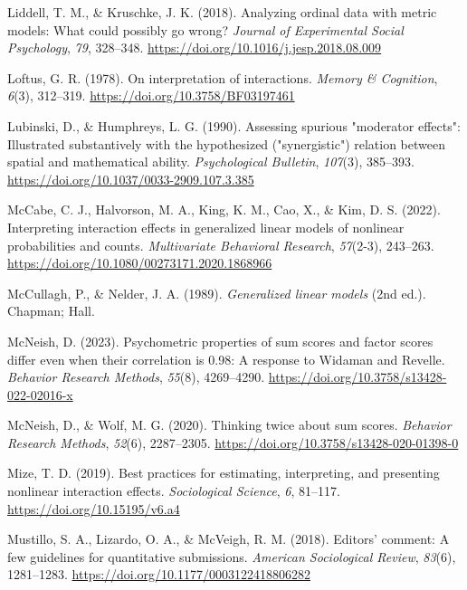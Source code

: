 \documentclass[
  man,
  floatsintext,
  longtable,
  nolmodern,
  notxfonts,
  notimes,
  colorlinks=true,linkcolor=blue,citecolor=blue,urlcolor=blue]{apa7}
\newlength{\cslhangindent}
\newenvironment{CSLReferences}[2] %
 {\begin{list}{}{%
  \setlength{\itemindent}{0pt}
  \setlength{\leftmargin}{0pt}
  \setlength{\parsep}{0pt}
  \ifodd #1
   \setlength{\leftmargin}{\cslhangindent}
   \setlength{\itemindent}{-1\cslhangindent}
  \fi
  \setlength{\itemsep}{#2\baselineskip}}}
 {\end{list}}
\begin{document}
\begin{CSLReferences}{1}{0}
Liddell, T. M., \& Kruschke, J. K. (2018). Analyzing ordinal data with
metric models: What could possibly go wrong? \emph{Journal of
Experimental Social Psychology}, \emph{79}, 328--348.
\url{https://doi.org/10.1016/j.jesp.2018.08.009}

Loftus, G. R. (1978). On interpretation of interactions. \emph{Memory \&
Cognition}, \emph{6}(3), 312--319.
\url{https://doi.org/10.3758/BF03197461}

Lubinski, D., \& Humphreys, L. G. (1990). Assessing spurious
{"}moderator effects{"}: Illustrated substantively with the hypothesized
({"}synergistic{"}) relation between spatial and mathematical ability.
\emph{Psychological Bulletin}, \emph{107}(3), 385--393.
\url{https://doi.org/10.1037/0033-2909.107.3.385}

McCabe, C. J., Halvorson, M. A., King, K. M., Cao, X., \& Kim, D. S.
(2022). Interpreting interaction effects in generalized linear models of
nonlinear probabilities and counts. \emph{Multivariate Behavioral
Research}, \emph{57}(2-3), 243--263.
\url{https://doi.org/10.1080/00273171.2020.1868966}

McCullagh, P., \& Nelder, J. A. (1989). \emph{Generalized linear models}
(2nd ed.). Chapman; Hall.

McNeish, D. (2023). Psychometric properties of sum scores and factor
scores differ even when their correlation is 0.98: A response to
{Widaman} and {Revelle}. \emph{Behavior Research Methods}, \emph{55}(8),
4269--4290. \url{https://doi.org/10.3758/s13428-022-02016-x}

McNeish, D., \& Wolf, M. G. (2020). Thinking twice about sum scores.
\emph{Behavior Research Methods}, \emph{52}(6), 2287--2305.
\url{https://doi.org/10.3758/s13428-020-01398-0}

Mize, T. D. (2019). Best practices for estimating, interpreting, and
presenting nonlinear interaction effects. \emph{Sociological Science},
\emph{6}, 81--117. \url{https://doi.org/10.15195/v6.a4}

Mustillo, S. A., Lizardo, O. A., \& McVeigh, R. M. (2018). Editors{'}
comment: A few guidelines for quantitative submissions. \emph{American
Sociological Review}, \emph{83}(6), 1281--1283.
\url{https://doi.org/10.1177/0003122418806282}


\end{CSLReferences}
\end{document}
